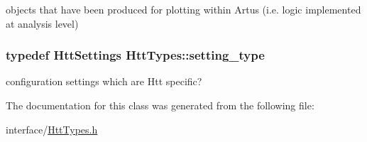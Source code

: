 objects that have been produced for plotting within Artus (i.e. logic implemented at analysis level) \hypertarget{classHttTypes_a25629547ad3af93af6e61b8bf62a160e}{
\subsubsection[{setting\_\-type}]{\setlength{\rightskip}{0pt plus 5cm}typedef {\bf HttSettings} {\bf HttTypes::setting\_\-type}}}
\label{classHttTypes_a25629547ad3af93af6e61b8bf62a160e}


configuration settings which are Htt specific? 

The documentation for this class was generated from the following file:\begin{DoxyCompactItemize}
\item 
interface/\hyperlink{HttTypes_8h}{HttTypes.h}\end{DoxyCompactItemize}
